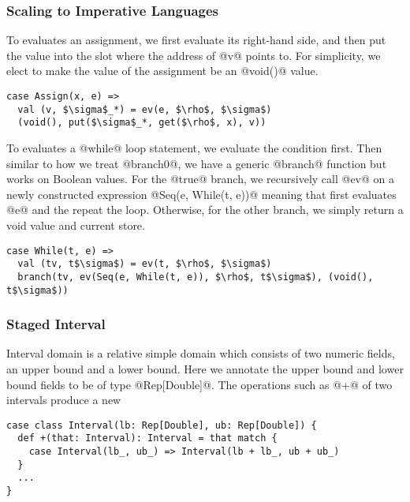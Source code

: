 \subsubsection{Scaling to Imperative Languages}

To evaluates an assignment, we first evaluate its right-hand side, and then put
the value into the slot where the address of @v@ points to. For simplicity, we
elect to make the value of the assignment be an @void()@ value.
\begin{lstlisting}
case Assign(x, e) =>
  val (v, $\sigma$_*) = ev(e, $\rho$, $\sigma$)
  (void(), put($\sigma$_*, get($\rho$, x), v))
\end{lstlisting}

To evaluates a @while@ loop statement, we evaluate the condition first. Then
similar to how we treat @branch0@, we have a generic @branch@ function but works
on Boolean values. For the @true@ branch, we recursively call @ev@ on a newly
constructed expression @Seq(e, While(t, e))@ meaning that first evaluates @e@
and the repeat the loop. Otherwise, for the other branch, we simply return a
void value and current store.
\begin{lstlisting}
case While(t, e) =>
  val (tv, t$\sigma$) = ev(t, $\rho$, $\sigma$)
  branch(tv, ev(Seq(e, While(t, e)), $\rho$, t$\sigma$), (void(), t$\sigma$))
\end{lstlisting}

\subsubsection{Staged Interval}

Interval domain is a relative simple domain which consists of two numeric
fields, an upper bound and a lower bound. Here we annotate the upper bound and
lower bound fields to be of type @Rep[Double]@. The operations such as @+@ of
two intervals produce a new
\begin{lstlisting}
case class Interval(lb: Rep[Double], ub: Rep[Double]) {
  def +(that: Interval): Interval = that match {
    case Interval(lb_, ub_) => Interval(lb + lb_, ub + ub_)
  }
  ...
}
\end{lstlisting}

\fi
